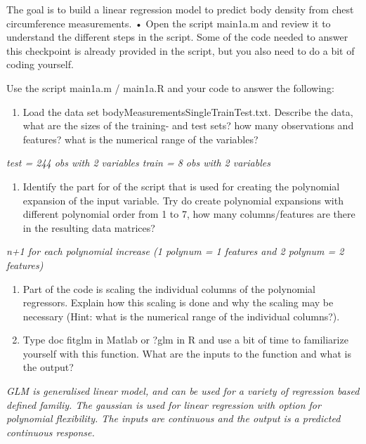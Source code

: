 \documentclass[
  letterpaper,
  DIV=11,
  numbers=noendperiod]{scrartcl}
\providecommand{\tightlist}{%
  \setlength{\itemsep}{0pt}\setlength{\parskip}{0pt}}\usepackage{longtable,booktabs,array}
\begin{document}
The goal is to build a linear regression model to predict body density
from chest circumference measurements. • Open the script main1a.m and
review it to understand the different steps in the script. Some of the
code needed to answer this checkpoint is already provided in the script,
but you also need to do a bit of coding yourself.

Use the script main1a.m / main1a.R and your code to answer the
following:

\begin{enumerate}
\def\labelenumi{(\alph{enumi})}
\tightlist
\item
  Load the data set bodyMeasurementsSingleTrainTest.txt. Describe the
  data, what are the sizes of the training- and test sets? how many
  observations and features? what is the numerical range of the
  variables?
\end{enumerate}

\emph{test = 244 obs with 2 variables train = 8 obs with 2 variables}

\begin{enumerate}
\def\labelenumi{(\alph{enumi})}
\setcounter{enumi}{1}
\tightlist
\item
  Identify the part for of the script that is used for creating the
  polynomial expansion of the input variable. Try do create polynomial
  expansions with different polynomial order from 1 to 7, how many
  columns/features are there in the resulting data matrices?
\end{enumerate}

\emph{n+1 for each polynomial increase (1 polynum = 1 features and 2
polynum = 2 features)}

\begin{enumerate}
\def\labelenumi{(\alph{enumi})}
\setcounter{enumi}{2}
\item
  Part of the code is scaling the individual columns of the polynomial
  regressors. Explain how this scaling is done and why the scaling may
  be necessary (Hint: what is the numerical range of the individual
  columns?).
\item
  Type doc fitglm in Matlab or ?glm in R and use a bit of time to
  familiarize yourself with this function. What are the inputs to the
  function and what is the output?
\end{enumerate}

\emph{GLM is generalised linear model, and can be used for a variety of
regression based defined familiy. The gaussian is used for linear
regression with option for polynomial flexibility. The inputs are
continuous and the output is a predicted continuous response.}
\end{document}
